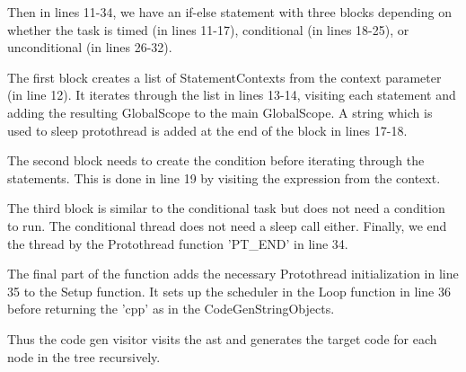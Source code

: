 Then in lines 11-34, we have an if-else statement with three blocks depending on whether the task is timed (in lines 11-17), conditional (in lines 18-25), or unconditional (in lines 26-32).

The first block creates a list of StatementContexts from the context parameter (in line 12). It iterates through the list in lines 13-14, visiting each statement and adding the resulting GlobalScope to the main GlobalScope. A string which is used to sleep protothread is added at the end of the block in lines 17-18.

The second block needs to create the condition before iterating through the statements. This is done in line 19 by visiting the expression from the context.

The third block is similar to the conditional task but does not need a condition to run. The conditional thread does not need a sleep call either. Finally, we end the thread by the Protothread function 'PT\_END' in line 34.

The final part of the function adds the necessary Protothread initialization in line 35 to the Setup function. It sets up the scheduler in the Loop function in line 36 before returning the 'cpp' as in the CodeGenStringObjects.

Thus the code gen visitor visits the \gls{ast} and generates the target code for each node in the tree recursively.

